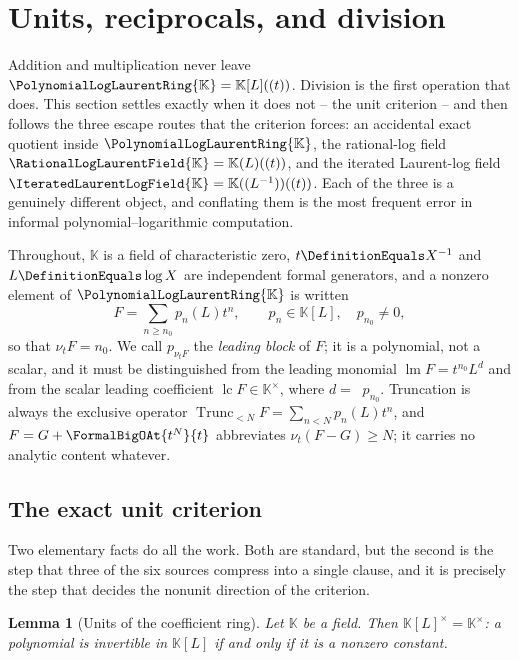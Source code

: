 \documentclass[11pt,oneside]{article}
\theoremstyle{plain}
\newtheorem{lemma}[theorem]{Lemma}
\theoremstyle{definition}
\theoremstyle{remark}
\newcommand{\K}{\mathbb{K}}
\newcommand{\PLlau}{\PolynomialLogLaurentRing{\K}}       %
\newcommand{\PLrat}{\RationalLogLaurentField{\K}}        %
\newcommand{\PLit}{\IteratedLaurentLogField{\K}}         %
\newcommand{\ordt}{\nu_{t}}                              %
\DeclareMathOperator{\lm}{lm}
\DeclareMathOperator{\lc}{lc}
\DeclareMathOperator{\degL}{deg_{L}}
\newcommand{\Trunc}[2]{\operatorname{Trunc}_{<#2}#1}     %
\begin{document}
\section{Units, reciprocals, and division}
\label{plt:sec:division}

Addition and multiplication never leave \(\PLlau=\K[L]((t))\).  Division is the
first operation that does.  This section settles exactly when it does not --
the unit criterion -- and then follows the three escape routes that the
criterion forces: an accidental exact quotient inside \(\PLlau\), the
rational-log field \(\PLrat=\K(L)((t))\), and the iterated Laurent-log field
\(\PLit=\K((L^{-1}))((t))\).  Each of the three is a genuinely different
object, and conflating them is the most frequent error in informal
polynomial--logarithmic computation.

Throughout, \(\K\) is a field of characteristic zero, \(t\DefinitionEquals
X^{-1}\) and \(L\DefinitionEquals\log X\) are independent formal generators, and
a nonzero element of \(\PLlau\) is written
\begin{equation}\label{plt:eq:div-normal-form}
  F=\sum_{n\ge n_{0}}p_{n}(L)t^{n},
  \qquad p_{n}\in\K[L],\quad p_{n_{0}}\ne0,
\end{equation}
so that \(\ordt F=n_{0}\).  We call \(p_{\ordt F}\) the \emph{leading block} of
\(F\); it is a polynomial, not a scalar, and it must be distinguished from the
leading monomial \(\lm F=t^{n_{0}}L^{d}\) and from the scalar leading
coefficient \(\lc F\in\K^{\times}\), where \(d=\degL p_{n_{0}}\).  Truncation is
always the exclusive operator \(\Trunc{F}{N}=\sum_{n<N}p_{n}(L)t^{n}\), and
\(F=G+\FormalBigOAt{t^{N}}{t}\) abbreviates \(\ordt(F-G)\ge N\); it carries no
analytic content whatever.

\subsection{The exact unit criterion}
\label{plt:sec:div-units}

Two elementary facts do all the work.  Both are standard, but the second is the
step that three of the six sources compress into a single clause, and it is
precisely the step that decides the nonunit direction of the criterion.

\begin{lemma}[Units of the coefficient ring]\label{plt:lem:div-poly-units}
Let \(\K\) be a field.  Then \(\K[L]^{\times}=\K^{\times}\): a polynomial is
invertible in \(\K[L]\) if and only if it is a nonzero constant.
\end{lemma}
\end{document}
